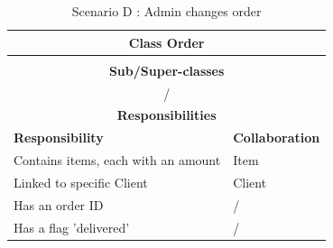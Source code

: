 \documentclass[•]{article}
\begin{document}
\begin{table}
\begin{tabular}{|l||l|}
\hline
\multicolumn{2}{|c|}{ Class \textbf{Order} }\\ \hline
\multicolumn{2}{|c|}{}\\ \hline
\multicolumn{2}{|c|}{ \textbf{Sub/Super-classes} }\\ \hline
\multicolumn{2}{|c|}{/} \\ \hline
\multicolumn{2}{|c|}{ \textbf{Responsibilities}}\\ \hline
\textbf{Responsibility} & \textbf{Collaboration} \\ \hline
Contains items, each with an amount & Item \\ \hline
Linked to specific Client & Client \\ \hline
Has an order ID & / \\ \hline
Has a flag 'delivered' & / \\ \hline
\end{tabular}

\caption{Scenario D : Admin changes order}
\label{scenarioD}
\end{table}
\end{document}
